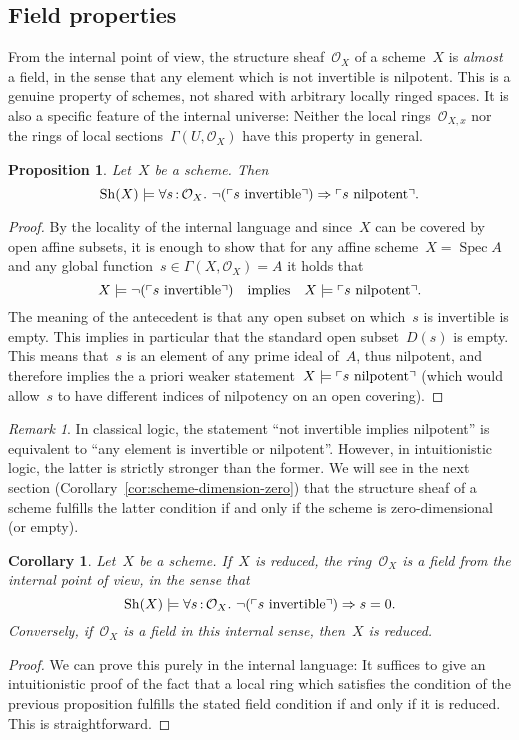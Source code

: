 \documentclass[10pt]{amsart}
\theoremstyle{definition}
\theoremstyle{plain}
\newtheorem{prop}[defn]{Proposition}
\newtheorem{cor}[defn]{Corollary}
\theoremstyle{remark}
\newtheorem{rem}[defn]{Remark}
\renewcommand{\O}{\mathcal{O}}
\newcommand{\Sh}{\mathrm{Sh}}
\DeclareMathOperator{\Spec}{Spec}
\newcommand{\?}{\,{:}\,}
\renewcommand{\_}{\mathpunct{.}\,}
\newcommand{\speak}[1]{\ulcorner\text{\textnormal{#1}}\urcorner}
\begin{document}
\subsection{Field properties} From the internal point of view, the structure
sheaf~$\O_X$ of a scheme~$X$ is \emph{almost} a field, in the sense that any
element which is not invertible is nilpotent. This is a genuine property of
schemes, not shared with arbitrary locally ringed spaces. It is also a specific
feature of the internal universe: Neither the local rings~$\O_{X,x}$ nor the
rings of local sections~$\Gamma(U,\O_X)$ have this property in general.

\begin{prop}\label{prop:neginvnilpotent}Let~$X$ be a scheme. Then
\[ \Sh(X) \models \forall s\?\O_X\_ \neg(\speak{$s$ invertible}) \Rightarrow
\speak{$s$ nilpotent}. \]
\end{prop}
\begin{proof}By the locality of the internal language and since~$X$ can be
covered by open affine subsets, it is enough to show that for any affine
scheme~$X = \Spec A$ and any global function~$s \in \Gamma(X,\O_X) = A$ it holds
that
\[ X \models \neg(\speak{$s$ invertible}) \quad\text{implies}\quad
  X \models \speak{$s$ nilpotent}. \]
The meaning of the antecedent is that any open subset on which~$s$ is
invertible is empty. This implies in particular that the standard open subset~$D(s)$ is
empty. This means that~$s$ is an element of any prime ideal of~$A$, thus
nilpotent, and therefore implies the a priori weaker statement~$X \models \speak{$s$
nilpotent}$ (which would allow~$s$ to have different indices of nilpotency on
an open covering).
\end{proof}

\begin{rem}In classical logic, the statement ``not invertible implies
nilpotent'' is equivalent to ``any element is invertible or nilpotent''.
However, in intuitionistic logic, the latter is strictly stronger than the
former. We will see in the next section
(Corollary~\ref{cor:scheme-dimension-zero}) that the structure sheaf of a
scheme fulfills the latter condition if and only if the scheme is
zero-dimensional (or empty).\end{rem}

\begin{cor}\label{cor:field-reduced}
Let~$X$ be a scheme. If~$X$ is reduced, the ring~$\O_X$ is a field
from the internal point of view, in the sense that
\[ \Sh(X) \models \forall s\?\O_X\_ \neg(\speak{$s$ invertible}) \Rightarrow
s=0. \]
Conversely, if~$\O_X$ is a field in this internal sense, then~$X$ is reduced.\end{cor}
\begin{proof}We can prove this purely in the internal language: It suffices to
give an intuitionistic proof of the fact that a local ring which satisfies the
condition of the previous proposition fulfills the stated field condition if
and only if it is reduced. This is straightforward.
\end{proof}
\end{document}
